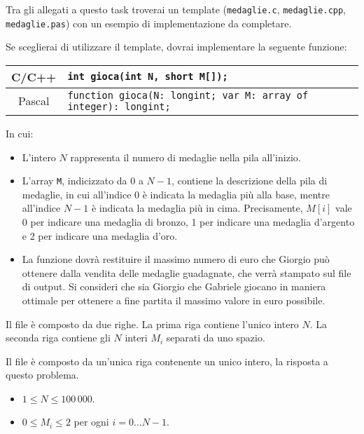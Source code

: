 \begin{warning}
Tra gli allegati a questo task troverai un template (\texttt{medaglie.c}, \texttt{medaglie.cpp}, \texttt{medaglie.pas}) con un esempio di implementazione da completare.
\end{warning}

Se sceglierai di utilizzare il template, dovrai implementare la seguente funzione:
\begin{center}\begin{tabularx}{\textwidth}{|c|X|}
\hline
C/C++  & \verb|int gioca(int N, short M[]);|\\
\hline
Pascal & \verb|function gioca(N: longint; var M: array of integer): longint;|\\
\hline
\end{tabularx}\end{center}
In cui:
\begin{itemize}[nolistsep]
  \item L'intero $N$ rappresenta il numero di medaglie nella pila all'inizio.
  \item L'array \texttt{M}, indicizzato da $0$ a $N-1$, contiene la descrizione della pila di medaglie, in cui all'indice $0$ è indicata la medaglia più alla base, mentre all'indice $N-1$ è indicata la medaglia più in cima. Precisamente, $M[i]$ vale 0 per indicare una medaglia di bronzo, 1 per indicare una medaglia d'argento e 2 per indicare una medaglia d'oro.
  \item La funzione dovrà restituire il massimo numero di euro che Giorgio può ottenere dalla vendita delle medaglie guadagnate, che verrà stampato sul file di output. Si consideri che sia Giorgio che Gabriele giocano in maniera ottimale per ottenere a fine partita il massimo valore in euro possibile.
\end{itemize}

\InputFile
Il file  è composto da due righe. La prima riga contiene l'unico intero $N$. La seconda riga contiene gli $N$ interi $M_i$ separati da uno spazio.

\OutputFile
Il file \outputfile{} è composto da un'unica riga contenente un unico intero, la risposta a questo problema.

\Constraints
\begin{itemize}[nolistsep, itemsep=2mm]
	\item $1 \le N \le 100\,000$.
	\item $0 \le M_i \le 2$ per ogni $i=0\ldots N-1$.
\end{itemize}


